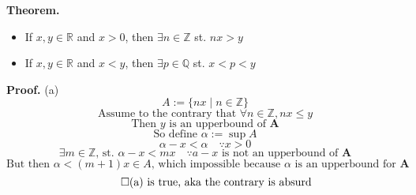 \documentclass{article}
\newcommand{\set}[2]{
	\{ #1 \mid #2 \}
}
\begin{document}
{\noindent\bf Theorem.}
	\begin{itemize}
		\item If $x, y \in \mathbb{R}$ and $x > 0$, then $\exists n \in \mathbb{Z}$ st. $nx > y$
		\item If $x, y \in \mathbb{R}$ and $x < y$, then $\exists p \in \mathbb{Q}$ st. $x < p < y$
	\end{itemize}

{\noindent\bf Proof.}
	(a)
	$$ A := \set{nx}{n \in \mathbb{Z}} $$
	$$ \text{Assume to the contrary that } \forall n \in \mathbb{Z}, nx \le y $$
	$$ \text{Then } y \text{ is an upperbound of } \mathbf{A} $$
	$$ \text{So define } \alpha := \sup A $$
	$$ \alpha - x < \alpha \quad\because x > 0 $$
	$$ \exists m \in \mathbb{Z} \text{, st. } \alpha - x < mx \quad\because a - x \text{ is not an upperbound of } \mathbf{A} $$
	$$ \text{But then } \alpha < (m+1)x \in A \text{, which impossible because $\alpha$ is an upperbound for $\mathbf{A}$}$$
	$$ \qed \text{(a) is true, aka the contrary is absurd} $$
\end{document}
